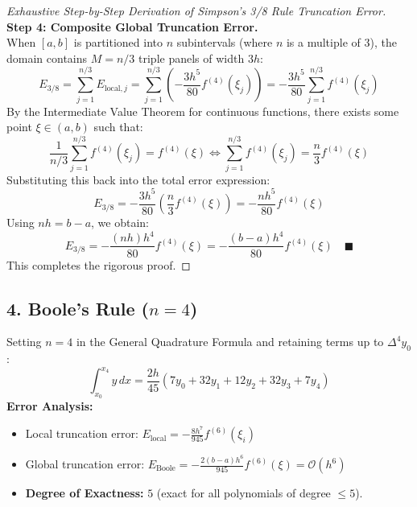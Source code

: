 \begin{proof}[Exhaustive Step-by-Step Derivation of Simpson's 3/8 Rule Truncation Error]
\medskip
\noindent\textbf{Step 4: Composite Global Truncation Error.} \\
When $[a, b]$ is partitioned into $n$ subintervals (where $n$ is a multiple of 3), the domain contains $M = n/3$ triple panels of width $3h$:
\begin{equation}
    E_{3/8} = \sum_{j=1}^{n/3} E_{\text{local}, j} = \sum_{j=1}^{n/3} \left( -\frac{3 h^5}{80} f^{(4)}(\xi_j) \right) = -\frac{3 h^5}{80} \sum_{j=1}^{n/3} f^{(4)}(\xi_j)
\end{equation}
By the Intermediate Value Theorem for continuous functions, there exists some point $\xi \in (a, b)$ such that:
\begin{equation}
    \frac{1}{n/3} \sum_{j=1}^{n/3} f^{(4)}(\xi_j) = f^{(4)}(\xi) \iff \sum_{j=1}^{n/3} f^{(4)}(\xi_j) = \frac{n}{3} f^{(4)}(\xi)
\end{equation}
Substituting this back into the total error expression:
\begin{equation}
    E_{3/8} = -\frac{3 h^5}{80} \left( \frac{n}{3} f^{(4)}(\xi) \right) = -\frac{n h^5}{80} f^{(4)}(\xi)
\end{equation}
Using $n h = b - a$, we obtain:
\begin{equation}
    \boxed{E_{3/8} = -\frac{(n h) h^4}{80} f^{(4)}(\xi) = -\frac{(b - a) h^4}{80} f^{(4)}(\xi)} \quad \blacksquare
\end{equation}
This completes the rigorous proof.
\end{proof}


\subsection{4. Boole's Rule \texorpdfstring{($n = 4$)}{(n = 4)}}
\begin{theorembox}
Setting $n = 4$ in the General Quadrature Formula and retaining terms up to $\Delta^4 y_0$:
\begin{equation}
    \boxed{\int_{x_0}^{x_4} y \, dx = \frac{2 h}{45} \left( 7 y_0 + 32 y_1 + 12 y_2 + 32 y_3 + 7 y_4 \right)}
\end{equation}
\textbf{Error Analysis:}
\begin{itemize}[noitemsep]
    \item Local truncation error: $E_{\text{local}} = -\frac{8 h^7}{945} f^{(6)}(\xi_i)$
    \item Global truncation error: $\boxed{E_{\text{Boole}} = -\frac{2 (b - a) h^6}{945} f^{(6)}(\xi) = \mathcal{O}(h^6)}$
    \item \textbf{Degree of Exactness:} $5$ (exact for all polynomials of degree $\le 5$).
\end{itemize}
\end{theorembox}


